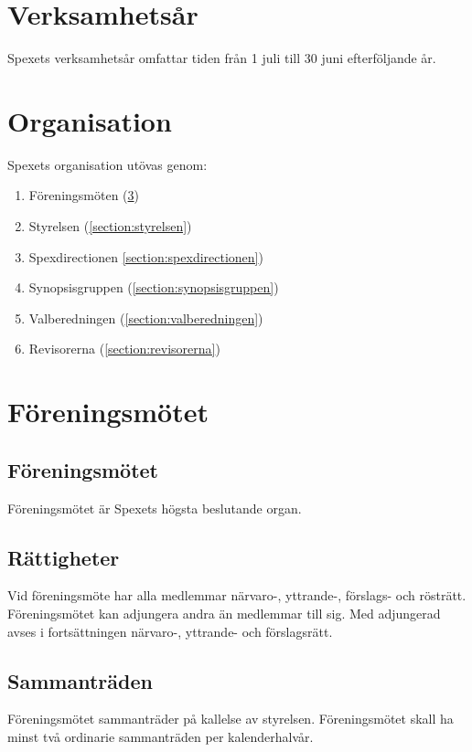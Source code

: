 \documentclass[a4paper]{article}
\begin{document}
\section{Verksamhetsår}

Spexets verksamhetsår omfattar tiden från 1 juli till 30 juni efterföljande år.

\section{Organisation}
Spexets organisation utövas genom:

\begin{enumerate}
  \item Föreningsmöten (\ref{section:föreningsmötet})
  \item Styrelsen (\ref{section:styrelsen})
  \item Spexdirectionen \ref{section:spexdirectionen})
  \item Synopsisgruppen (\ref{section:synopsisgruppen})
  \item Valberedningen (\ref{section:valberedningen})
  \item Revisorerna (\ref{section:revisorerna})
\end{enumerate}

\section{Föreningsmötet}
\label{section:föreningsmötet}

\subsection{Föreningsmötet}
Föreningsmötet är Spexets högsta beslutande organ.

\subsection{Rättigheter}
Vid föreningsmöte har alla medlemmar närvaro-, yttrande-, förslags- och rösträtt. Föreningsmötet kan adjungera andra än medlemmar till sig. Med adjungerad avses i fortsättningen närvaro-, yttrande- och förslagsrätt.

\subsection{Sammanträden}
Föreningsmötet sammanträder på kallelse av styrelsen. Föreningsmötet skall ha minst två ordinarie sammanträden per kalenderhalvår.
\end{document}
